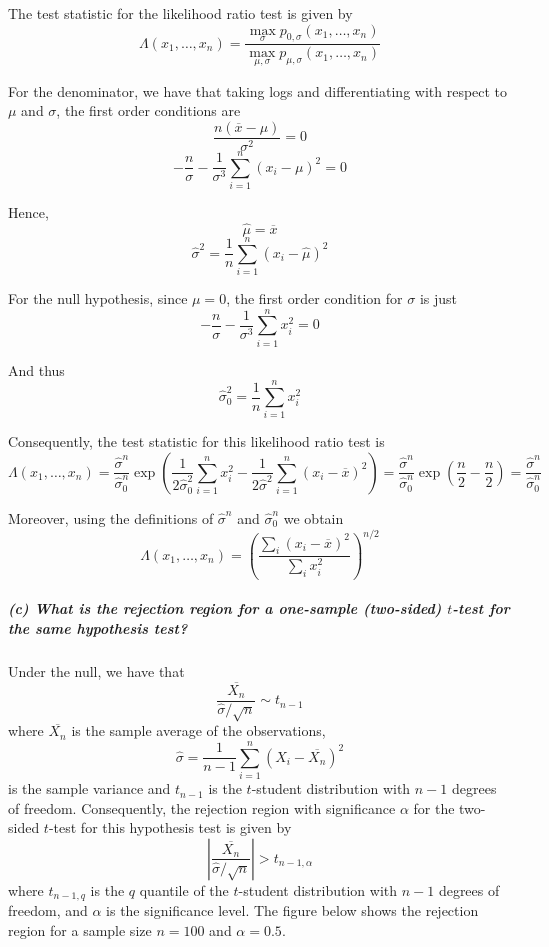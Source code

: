 \documentclass[11pt, english]{article}
\begin{document}
    The test statistic for the likelihood ratio test is given by
\[\Lambda(x_1, \ldots, x_n) = \frac{\max_{\sigma} p_{0,\sigma}(x_1,\ldots, x_n)}{\max_{\mu,\sigma} p_{\mu,\sigma}(x_1,\ldots, x_n)}\]

For the denominator, we have that taking logs and differentiating with
respect to \(\mu\) and \(\sigma\), the first order conditions are
\[\frac{n\left(\overline{x} - \mu\right)}{\sigma^2} = 0 \]
\[-\frac{n}{\sigma} - \frac{1}{\sigma^3}\sum_{i=1}^{n} (x_i-\mu)^2 = 0\]

Hence, \[\hat{\mu} = \overline{x}\]
\[\hat{\sigma}^2 = \frac{1}{n}\sum_{i=1}^{n} (x_i-\hat{\mu})^2\]

For the null hypothesis, since \(\mu = 0\), the first order condition
for \(\sigma\) is just
\[-\frac{n}{\sigma} - \frac{1}{\sigma^3}\sum_{i=1}^{n} x_i^2 = 0\]

And thus \[\hat{\sigma}_0^2 = \frac{1}{n}\sum_{i=1}^{n} x_i^2\]

Consequently, the test statistic for this likelihood ratio test is
\[\Lambda(x_1, \ldots, x_n) = \frac{\hat{\sigma}^{n}}{\hat{\sigma}_{0}^{n}}\exp\left(\frac{1}{2\hat{\sigma}_{0}^2} \sum_{i=1}^{n} x_i^2 - \frac{1}{2\hat{\sigma}^2} \sum_{i=1}^{n} (x_i - \overline{x})^2\right) = \frac{\hat{\sigma}^{n}}{\hat{\sigma}_{0}^{n}}\exp\left(\frac{n}{2} - \frac{n}{2}\right) = \frac{\hat{\sigma}^{n}}{\hat{\sigma}_{0}^{n}}\]

Moreover, using the definitions of \(\hat{\sigma}^{n}\) and
\(\hat{\sigma}_{0}^{n}\) we obtain
\[\Lambda(x_1, \ldots, x_n) = \left(\frac{\sum_i (x_i - \overline{x})^2}{\sum_i x_i^2} \right)^{n/2}\]

    \hypertarget{c-what-is-the-rejection-region-for-a-one-sample-two-sided-t-test-for-the-same-hypothesis-test}{%
\subparagraph{\texorpdfstring{(c) What is the rejection region for a
one-sample (two-sided) \(t\)-test for the same hypothesis
test?\\[2ex]}{(c) What is the rejection region for a one-sample (two-sided) t-test for the same hypothesis test?}}\label{c-what-is-the-rejection-region-for-a-one-sample-two-sided-t-test-for-the-same-hypothesis-test}}

    Under the null, we have that
\[\frac{\overline{X_n}}{\hat{\sigma}/\sqrt{n}} \sim t_{n-1}\] where
\(\overline{X_n}\) is the sample average of the observations,
\[\hat{\sigma} = \frac{1}{n-1}\sum_{i=1}^{n} \left(X_i - \overline{X_n}\right)^2\]
is the sample variance and \(t_{n-1}\) is the \(t\)-student distribution
with \(n-1\) degrees of freedom. Consequently, the rejection region with
significance \(\alpha\) for the two-sided \(t\)-test for this hypothesis
test is given by
\[\left| \frac{\overline{X_n}}{\hat{\sigma}/\sqrt{n}} \right| > t_{n-1,\alpha}\]
where \(t_{n-1,q}\) is the \(q\) quantile of the \(t\)-student
distribution with \(n-1\) degrees of freedom, and \(\alpha\) is the
significance level. The figure below shows the rejection region for a
sample size \(n=100\) and \(\alpha = 0.5\).
\end{document}
